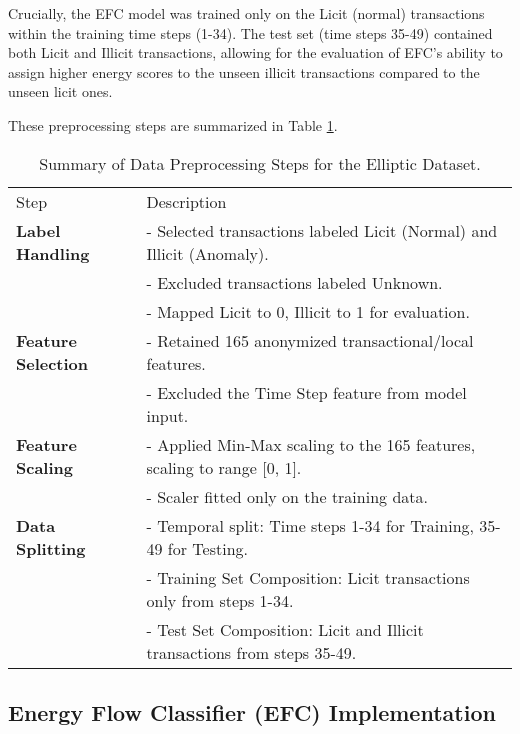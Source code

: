 \documentclass[12pt]{article}
\begin{document}
Crucially, the EFC model was trained only on the Licit (normal) transactions within the training time steps (1-34).
The test set (time steps 35-49) contained both Licit and Illicit transactions, allowing for the evaluation of EFC's
ability to assign higher energy scores to the unseen illicit transactions compared to the unseen licit ones.

These preprocessing steps are summarized in Table \ref{tab:preprocessing_summary}.

\begin{table}[htbp]
  \centering
  \caption{Summary of Data Preprocessing Steps for the Elliptic Dataset.}
  \label{tab:preprocessing_summary}
  \begin{tabular}{ll}
    \hline
    Step                  & Description \\
    \textbf{Label Handling} & - Selected transactions labeled Licit (Normal) and Illicit (Anomaly). \\
                          & - Excluded transactions labeled Unknown. \\
                          & - Mapped Licit to 0, Illicit to 1 for evaluation. \\
    \textbf{Feature Selection} & - Retained 165 anonymized transactional/local features. \\
                             & - Excluded the Time Step feature from model input. \\
    \textbf{Feature Scaling}  & - Applied Min-Max scaling to the 165 features, scaling to range [0, 1]. \\
                             & - Scaler fitted only on the training data. \\
    \textbf{Data Splitting}   & - Temporal split: Time steps 1-34 for Training, 35-49 for Testing. \\
                             & - Training Set Composition: Licit transactions only from steps 1-34. \\
                             & - Test Set Composition: Licit and Illicit transactions from steps 35-49. \\
  \end{tabular}
\end{table}

\subsection{Energy Flow Classifier (EFC) Implementation} \label{subsec:efc_implementation}
\end{document}
